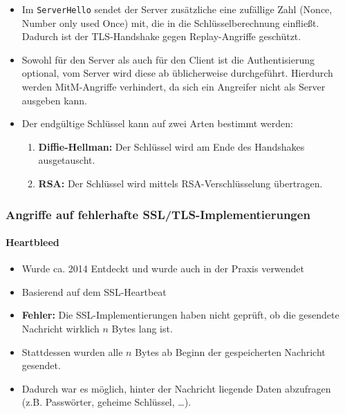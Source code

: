 \documentclass[a4paper, 11pt, accentcolor = tud3b]{tudreport}
\begin{document}
	                \begin{itemize}
	                	\item Im \texttt{ServerHello} sendet der Server zusätzliche eine zufällige Zahl (Nonce, Number only used Once) mit, die in die Schlüsselberechnung einfließt. Dadurch ist der TLS-Handshake gegen Replay-Angriffe geschützt.
	                	\item Sowohl für den Server als auch für den Client ist die Authentisierung optional, vom Server wird diese ab üblicherweise durchgeführt. Hierdurch werden MitM-Angriffe verhindert, da sich ein Angreifer nicht als Server ausgeben kann.
	                	\item Der endgültige Schlüssel kann auf zwei Arten bestimmt werden:
		                	\begin{enumerate}
		                		\item \textbf{Diffie-Hellman:} \tabto{3cm} Der Schlüssel wird am Ende des Handshakes ausgetauscht.
		                		\item \textbf{RSA:} \tabto{3cm} Der Schlüssel wird mittels RSA-Verschlüsselung übertragen.
		                	\end{enumerate}
	                \end{itemize}
                
                \subsubsection{Angriffe auf fehlerhafte SSL/TLS-Implementierungen}
	                \paragraph{Heartbleed}
		                \begin{itemize}
		                	\item Wurde ca. 2014 Entdeckt und wurde auch in der Praxis verwendet
		                	\item Basierend auf dem SSL-Heartbeat
		                	\item \textbf{Fehler:} Die SSL-Implementierungen haben nicht geprüft, ob die gesendete Nachricht wirklich \(n\) Bytes lang ist.
		                	\item Stattdessen wurden alle \(n\) Bytes ab Beginn der gespeicherten Nachricht gesendet.
		                	\item Dadurch war es möglich, hinter der Nachricht liegende Daten abzufragen (z.B. Passwörter, geheime Schlüssel, \dots).
		                \end{itemize}
	                
\end{document}
